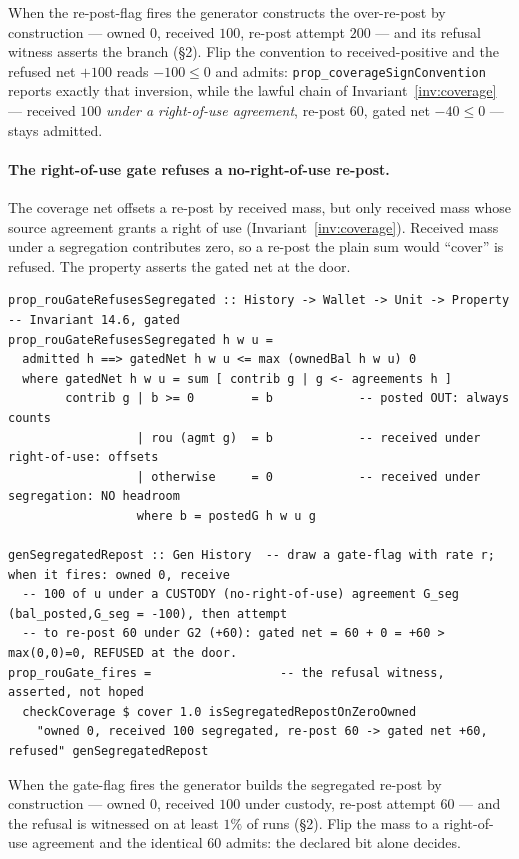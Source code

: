 \documentclass[11pt,a4paper]{article}
\begin{document}
When the re-post-flag fires the generator constructs the over-re-post by construction
--- owned $0$, received $100$, re-post attempt $200$ --- and its refusal witness asserts
the branch (\S 2). Flip the convention to received-positive and the refused net $+100$ reads
$-100 \le 0$ and admits: \texttt{prop\_coverageSignConvention} reports exactly that
inversion, while the lawful chain of Invariant~\ref{inv:coverage} --- received $100$
\emph{under a right-of-use agreement}, re-post $60$, gated net $-40 \le 0$ --- stays admitted.

\paragraph{The right-of-use gate refuses a no-right-of-use re-post.}
The coverage net offsets a re-post by received mass, but only received mass whose
source agreement grants a right of use (Invariant~\ref{inv:coverage}). Received mass
under a segregation contributes zero, so a re-post the plain sum would ``cover'' is
refused. The property asserts the gated net at the door.

\begin{lstlisting}
prop_rouGateRefusesSegregated :: History -> Wallet -> Unit -> Property  -- Invariant 14.6, gated
prop_rouGateRefusesSegregated h w u =
  admitted h ==> gatedNet h w u <= max (ownedBal h w u) 0
  where gatedNet h w u = sum [ contrib g | g <- agreements h ]
        contrib g | b >= 0        = b            -- posted OUT: always counts
                  | rou (agmt g)  = b            -- received under right-of-use: offsets
                  | otherwise     = 0            -- received under segregation: NO headroom
                  where b = postedG h w u g

genSegregatedRepost :: Gen History  -- draw a gate-flag with rate r; when it fires: owned 0, receive
  -- 100 of u under a CUSTODY (no-right-of-use) agreement G_seg (bal_posted,G_seg = -100), then attempt
  -- to re-post 60 under G2 (+60): gated net = 60 + 0 = +60 > max(0,0)=0, REFUSED at the door.
prop_rouGate_fires =                  -- the refusal witness, asserted, not hoped
  checkCoverage $ cover 1.0 isSegregatedRepostOnZeroOwned
    "owned 0, received 100 segregated, re-post 60 -> gated net +60, refused" genSegregatedRepost
\end{lstlisting}

When the gate-flag fires the generator builds the segregated re-post by construction ---
owned $0$, received $100$ under custody, re-post attempt $60$ --- and the refusal is
witnessed on at least $1\%$ of runs (\S 2). Flip the mass to a right-of-use agreement and
the identical $60$ admits: the declared bit alone decides.
\end{document}
